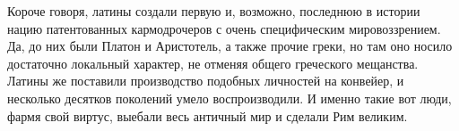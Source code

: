 Короче говоря, латины создали первую и, возможно, последнюю в истории нацию патентованных кармодрочеров с очень специфическим мировоззрением. Да, до них были Платон и Аристотель, а также прочие греки, но там оно носило достаточно локальный характер, не отменяя общего греческого мещанства. Латины же поставили производство подобных личностей на конвейер, и несколько десятков поколений умело воспроизводили. И именно такие вот люди, фармя свой виртус, выебали весь античный мир и сделали Рим великим. 